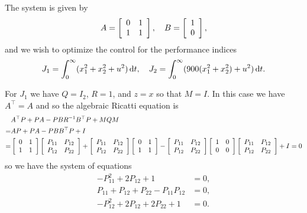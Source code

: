 \documentclass{article}
\begin{document}
The system is given by
$$
A =
\left[\begin{array}{c c}
  0 & 1 \\
  1 & 1
\end{array}\right], \quad
B =
\left[\begin{array}{c c}
  1 \\
  0
\end{array}\right],
$$
and we wish to optimize the control for the performance indices
$$
J_1 = \int_0^\infty (x_1^2 + x_2^2 + u^2) \dif t, \quad
J_2 = \int_0^\infty (900(x_1^2 + x_2^2) + u^2) \dif t.
$$

For $J_1$ we have $Q = I_2$, $R = 1$, and $z = x$ so that
$M = I$. In this case we have $A^{\top} = A$ and so
the algebraic Ricatti equation is
\begin{align*}
   & A^\top P + P A - P B R^{-1} B^\top P + M Q M \\
 = & A P + P A - P B B^\top P + I \\
 = &
\left[\begin{array}{c c}
0 & 1 \\
1 & 1
\end{array}\right]
\left[\begin{array}{c c}
P_{11} & P_{12} \\
P_{12} & P_{22}
\end{array}\right]
+
\left[\begin{array}{c c}
P_{11} & P_{12} \\
P_{12} & P_{22}
\end{array}\right]
\left[\begin{array}{c c}
0 & 1 \\
1 & 1
\end{array}\right]
-
\left[\begin{array}{c c}
P_{11} & P_{12} \\
P_{12} & P_{22}
\end{array}\right]
\left[\begin{array}{c c}
1 & 0 \\
0 & 0
\end{array}\right]
\left[\begin{array}{c c}
P_{11} & P_{12} \\
P_{12} & P_{22}
\end{array}\right]
+
I = 0
\end{align*}
so we have the system of equations
\begin{align*}
  - P_{11}^2 + 2 P_{12} + 1 &= 0, \\
    P_{11}   +   P_{12} + P_{22} - P_{11} P_{12} &= 0, \\
  - P_{12}^2 + 2 P_{12} + 2 P_{22} + 1 &= 0.
\end{align*}
\end{document}
